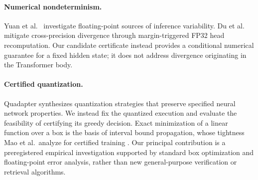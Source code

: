 \paragraph{Numerical nondeterminism.}
Yuan et al.\ \cite{yuan2025nondeterminism} investigate floating-point sources of inference variability. Du et al.\ \cite{du2026precision} mitigate cross-precision divergence through margin-triggered FP32 head recomputation. Our candidate certificate instead provides a conditional numerical guarantee for a fixed hidden state; it does not address divergence originating in the Transformer body.

\paragraph{Certified quantization.}
Quadapter \cite{zhang2024certified} synthesizes quantization strategies that preserve specified neural network properties. We instead fix the quantized execution and evaluate the feasibility of certifying its greedy decision. Exact minimization of a linear function over a box is the basis of interval bound propagation, whose tightness Mao et al.\ analyze for certified training \cite{mao2024understanding}. Our principal contribution is a preregistered empirical investigation supported by standard box optimization and floating-point error analysis, rather than new general-purpose verification or retrieval algorithms.
